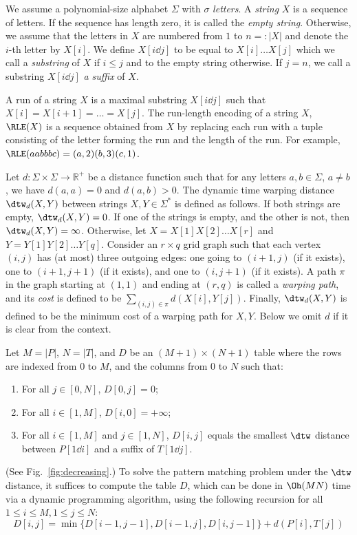 We assume a polynomial-size alphabet $\Sigma$ with $\sigma$ \emph{letters}. A \emph{string} $X$ is a sequence of letters. If the sequence has length zero, it is called the \emph{empty string}.  Otherwise, we assume that the letters in $X$ are numbered from $1$ to $n =: |X|$ and denote the $i$-th letter by $X[i]$. We define $X[i \dd j]$ to be equal to $X[i] \dots X[j]$ which we call a \emph{substring} of $X$ if $i \le j$ and to the empty string otherwise. If $j = n$, we call a substring $X[i \dd j]$ \emph{a suffix} of $X$.

\begin{definition}
A run of a string $X$ is a maximal substring $X[i \dd j]$ such that $X[i] = X[i+1] = \ldots = X[j]$. The run-length encoding of a string $X$, $\RLE(X)$ is a sequence obtained from $X$ by replacing each run with a tuple consisting of the letter forming the run and the length of the run. For example, $\RLE(aabbbc) = (a,2) (b,3)(c,1)$.
\end{definition}

Let $d: \Sigma \times \Sigma \rightarrow \mathbb{R}^+$ be a distance function such that for any letters $a,b \in \Sigma$, $a\neq b$, we have $d(a,a) = 0$ and $d(a,b) > 0$. The dynamic time warping distance $\dtw_d(X,Y)$ between strings $X,Y \in \Sigma^\ast$ is defined as follows. If both strings are empty, $\dtw_d(X,Y) = 0$. If one of the strings is empty, and the other is not, then  $\dtw_d(X,Y) = \infty$. Otherwise, let $X = X[1] X[2] \ldots X[r]$ and $Y = Y[1] Y[2] \ldots Y[q]$.  Consider an $r \times q$ grid graph such that each vertex $(i,j)$ has (at most) three outgoing edges: one going to $(i+1,j)$ (if it exists), one to $(i+1,j+1)$ (if it exists), and one to $(i,j+1)$ (if it exists). A path $\pi$ in the graph starting at $(1,1)$ and ending at $(r,q)$ is called a \emph{warping path}, and its \emph{cost} is defined to be $\sum_{(i,j) \in \pi} d(X[i],Y[j])$. Finally, $\dtw_d(X,Y)$ is defined to be the minimum cost of a warping path for $X,Y$. Below we omit $d$ if it is clear from the context. 

Let $M = |P|$, $N = |T|$, and $D$ be an $(M+1) \times (N+1)$ table where the rows are indexed from $0$ to $M$, and the columns from $0$ to $N$ such that:
\begin{enumerate}
\item For all $j \in [0, N]$, $D[0,j] = 0$;
\item For all $i \in [1, M]$, $D[i,0] = +\infty$;
\item For all $i \in [1, M]$ and $j \in [1, N]$, $D[i,j]$ equals the smallest $\dtw$ distance between $P[1\dd i]$ and a suffix of $T[1 \dd j]$. 
\end{enumerate}
(See Fig.~\ref{fig:decreasing}.) To solve the pattern matching problem under the $\dtw$ distance, it suffices to compute the table $D$, which can be done in $\Oh(MN)$ time via a dynamic programming algorithm, using the following recursion for all $1 \le i \le M, 1 \le j \le N$:
\begin{equation}\label{eq:recursion}
D[i,j] = 
\min\{D[i-1,j-1],D[i-1,j], D[i,j-1]\}+ d(P[i], T[j])
\end{equation}


